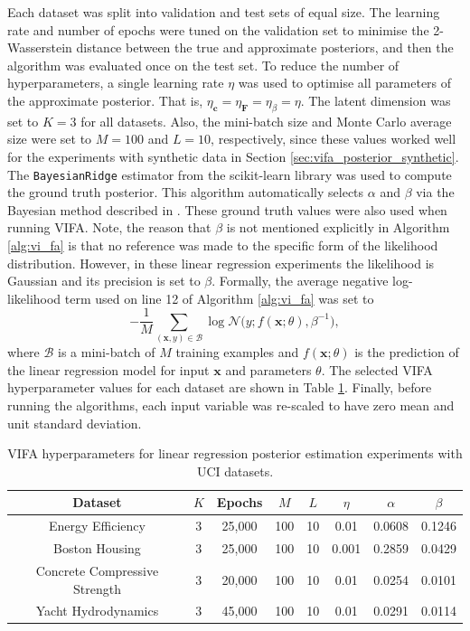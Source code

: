 \documentclass[msc,deptreport.inf]{infthesis} %
\newcommand{\matr}[1]{\mathbf{#1}}
\begin{document}
Each dataset was split into validation and test sets of equal size. The learning rate and number of epochs were tuned on the validation set to minimise the 2-Wasserstein distance between the true and approximate posteriors, and then the algorithm was evaluated once on the test set. To reduce the number of hyperparameters, a single learning rate $\eta$ was used to optimise all parameters of the approximate posterior. That is, $\eta_\matr{c} = \eta_\matr{F} = \eta_\beta = \eta$. The latent dimension was set to $K=3$ for all datasets. Also, the mini-batch size and Monte Carlo average size were set to $M=100$ and $L=10$, respectively, since these values worked well for the experiments with synthetic data in Section \ref{sec:vifa_posterior_synthetic}. The \texttt{BayesianRidge} estimator from the scikit-learn library \cite{pedregosa2012} was used to compute the ground truth posterior. This algorithm automatically selects $\alpha$ and $\beta$ via the Bayesian method described in \cite{mackay1992}. These ground truth values were also used when running VIFA. Note, the reason that $\beta$ is not mentioned explicitly in Algorithm \ref{alg:vi_fa} is that no reference was made to the specific form of the likelihood distribution. However, in these linear regression experiments the likelihood is Gaussian and its precision is set to $\beta$. Formally, the average negative log-likelihood term used on line 12 of Algorithm \ref{alg:vi_fa} was set to
\begin{equation}
	-\frac{1}{M} \sum_{(\matr{x}, y) \in \mathcal{B}} \log \mathcal{N}\big(y; f(\matr{x}; \theta), \beta^{-1}\big),
\end{equation}
where $\mathcal{B}$ is a mini-batch of $M$ training examples and $f(\matr{x}; \theta)$ is the prediction of the linear regression model for input $\matr{x}$ and parameters $\theta$. The selected VIFA hyperparameter values for each dataset are shown in Table \ref{table:vifa_uci_hyperparameters}. Finally, before running the algorithms, each input variable was re-scaled to have zero mean and unit standard deviation.

\begin{table}[h!]
	\begin{center}
		\begin{tabular}{||c c c c c c c c||} 
			\hline
 			Dataset & $K$ & Epochs & $M$ & $L$ & $\eta$ & $\alpha$ & $\beta$ \\ [0.5ex] 
			\hline\hline
			Energy Efficiency 				& 3 & 25,000 & 100 & 10 	& 0.01 	& 0.0608 & 0.1246 \\ 
 			\hline
			Boston Housing 				& 3 & 25,000 & 100 & 10 	& 0.001 	& 0.2859 & 0.0429 \\
 			\hline
 			Concrete Compressive Strength	& 3 & 20,000 & 100 & 10 	& 0.01 	& 0.0254 & 0.0101 \\
 			\hline
 			Yacht Hydrodynamics 			& 3 & 45,000 & 100 & 10 	& 0.01 	& 0.0291 & 0.0114 \\ [1ex] 
 			\hline
		\end{tabular}
		\caption{VIFA hyperparameters for linear regression posterior estimation experiments with UCI datasets.}
		\label{table:vifa_uci_hyperparameters}
	\end{center}
\end{table}
\end{document}
